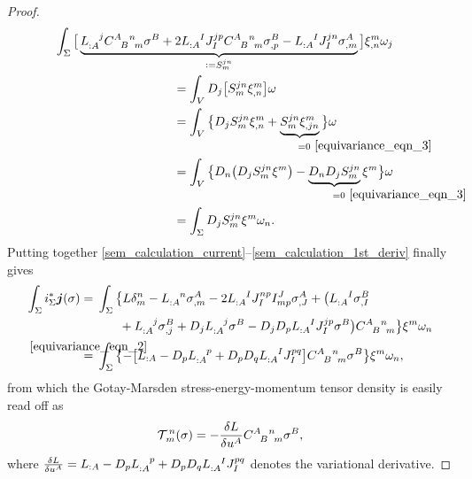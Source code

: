 \begin{proof}
\begin{equation}
\begin{multlined}
      \int_\Sigma \big\lbrack \underbrace{L_{:A}^{\hphantom{:A}j} \gmc{A}{B}{n}{m}\sigma^B + 2 L_{:A}^{\hphantom{:A}I} J_I^{jp} \gmc{A}{B}{n}{m}\sigma^B_{,p} - L_{:A}^{\hphantom{:A}I} J_I^{jn}\sigma^A_{,m}}_{\vcentcolon=S_m^{jn}}\big\rbrack \xi^m_{,n}\omega_j \\
      \begin{aligned}
        &{} = \int_V D_j \big\lbrack S_m^{jn} \xi^m_{,n}\big\rbrack \omega \\
        &{} = \int_V \big\{ D_j S_m^{jn} \xi^m_{,n} + \underbrace{S_m^{jn} \xi^m_{,jn}}_{\mathrlap{\!=0\ \eqref{equivariance_eqn_3}}}\big\}\omega\\
        &{} = \int_V \big\{ D_n\big( D_j S_m^{jn} \xi^m\big) - \underbrace{D_n D_j S_m^{jn}}_{\mathrlap{\!=0\ \eqref{equivariance_eqn_3}}} \xi^m \big\}\omega\\
        &{} = \int_\Sigma D_j S_m^{jn} \xi^m \omega_n.
      \end{aligned}
    \end{multlined}
  \end{equation}
  Putting together \eqref{sem_calculation_current}--\eqref{sem_calculation_1st_deriv} finally gives
  \begin{equation}
    \begin{aligned}
      \int_\Sigma i_\Sigma^\ast\boldsymbol{j}(\sigma) &{} =\, \int_\Sigma \big\{ L\delta^n_m - L_{:A}^{\hphantom{:A}n}\sigma^A_{,m} - 2 L_{:A}^{\hphantom{:A}I}J_I^{np} I^J_{mp} \sigma^A_{,J} + \big(L_{:A}^{\hphantom{:A}I}\sigma^B_{,I} \\
                                                        &{} \hphantom{=\, \int_\Sigma\big\{} + L_{:A}^{\hphantom{:A}j}\sigma^B_{,j} + D_j L_{:A}^{\hphantom{:A}j}\sigma^B - D_j D_p L_{:A}^{\hphantom{:A}I}J_I^{jp} \sigma^B \big)\gmc{A}{B}{n}{m} \big\} \xi^m \omega_n \\
                                                        &{} \stackrel{\mathclap{\eqref{equivariance_eqn_2}}}{=}\, \int_\Sigma \big\{{-\big\lbrack} L_{:A} - D_p L_{:A}^{\hphantom{:A}p} + D_p D_q L_{:A}^{\hphantom{:A}I} J_I^{pq} \big\rbrack \gmc{A}{B}{n}{m} \sigma^B \big\} \xi^m \omega_n,
    \end{aligned}
  \end{equation}
  from which the Gotay-Marsden stress-energy-momentum tensor density is easily read off as
  \begin{equation}\label{sem_tensor_result}
    \mathcal T^{\,n}_{\,m}(\sigma) = -\frac{\delta L}{\delta u^A} \gmc{A}{B}{n}{m} \sigma^B,
  \end{equation}
  where $\frac{\delta L}{\delta u^A} =  L_{:A} - D_p L_{:A}^{\hphantom{:A}p} + D_p D_q L_{:A}^{\hphantom{:A}I} J_I^{pq}$ denotes the variational derivative. 
\end{proof}

